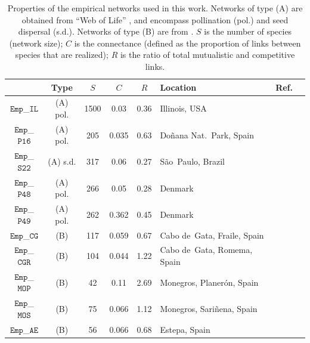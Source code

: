 \begin{table}[htbp]
\caption[Properties of the empirical networks]{Properties of the empirical networks used in this work. Networks of type (A) are obtained from ``Web of Life'' \cite{weboflife}, and encompass pollination (pol.) and seed dispersal (s.d.). Networks of type (B) are from \cite{Saiz2017EvidenceNetworks}. $S$ is the number of species (network size); $C$ is the connectance (defined as the proportion of links between species that are realized); $R$ is the ratio of total mutualistic and competitive links.}
\label{tab:empnetworks}
\begin{tabularx}{\textwidth}{ c c c  c c X X X} 
 \hline
  & Type & $S$ &  $C$ & $R$  & Location & Ref. \\ 
 \hline\hline
 $\texttt{Emp}$\_$\texttt{IL}$ & (A) pol. & 1500 &  0.03  & 0.36  & Illinois, USA & \cite{robertson1928flowers} \\ 
 \hline
   $\texttt{Emp}$\_$\texttt{P16}$ & (A) pol. & 205 &  0.035 & 0.63  & Doñana Nat.~Park, Spain & \cite{herrera1988pollination}\\ 
 \hline
 $\texttt{Emp}$\_$\texttt{S22}$ & (A) s.d. & 317 &  0.06  & 0.27  & São~Paulo, Brazil & \cite{silva2002patterns}\\ 
  \hline
  $\texttt{Emp}$\_$\texttt{P48}$ & (A) pol. & 266 &  0.05  & 0.28 & Denmark & \cite{dupont2009ecological} \\ 
  \hline
   $\texttt{Emp}$\_$\texttt{P49}$ & (A) pol. & 262 &  0.362 & 0.45 & Denmark & \cite{bek2006pollination}\\ 
  \hline\hline
   $\texttt{Emp}$\_$\texttt{CG}$ & (B) & 117 & 0.059  &  0.67   & Cabo de~Gata, Fraile, Spain & \cite{Saiz2017EvidenceNetworks}\\ 
 \hline
   $\texttt{Emp}$\_$\texttt{CGR}$ & (B) &  104 &  0.044 & 1.22 & Cabo de~Gata, Romema, Spain & \cite{Saiz2017EvidenceNetworks}\\ 
 \hline
   $\texttt{Emp}$\_$\texttt{MOP}$ & (B) &  42 &  0.11   & 2.69 & Monegros, Planerón, Spain & \cite{Saiz2017EvidenceNetworks}\\ 
 \hline
   $\texttt{Emp}$\_$\texttt{MOS}$ & (B) &  75 &  0.066 & 1.12  & Monegros, Sariñena, Spain & \cite{Saiz2017EvidenceNetworks}\\ 
   \hline
   $\texttt{Emp}$\_$\texttt{AE}$ & (B) &  56 & 0.066 & 0.68  & Estepa, Spain & \cite{Saiz2017EvidenceNetworks}\\ 
   \hline   
\end{tabularx}
\end{table}

